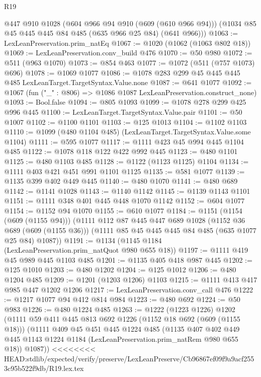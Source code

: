 \begin{lexlean}{R19}
\begin{coremodule}
{{{{{{{{{{{{{{{      @447
      @910
      @1028
      (@604 @966 @94 @910 (@609 (@610 @966 @94)))
      (@1034 @85 @45 @445 @445 @84 @485 (@635 @966 @25 @84) (@641 @966)))
@1063 := LexLeanPreservation.prim_natEq
@1067 := @1020 (@1062 (@1063 @802 @18))
@1069 := LexLeanPreservation.conv_build @476
@1070 := @50 @980
@1072 := @511 (@963 @1070)
@1073 := @854 @463
@1077 := @1072 (@511 (@757 @1073) @696)
@1078 := @1069 @1077
@1086 := @1078 @283 @299 @45 @445 @445 @485 LexLeanTarget.TargetSyntax.Value.none
@1087 := @641 @1077
@1092 := @1067 (fun ("_" : @806) => @1086 @1087 LexLeanPreservation.construct_none)
@1093 := Bool.false
@1094 := @805 @1093
@1099 := @1078 @278 @299 @425 @996 @445
@1100 := LexLeanTarget.TargetSyntax.Value.pair
@1101 := @50 @1007
@1102 := @1100 @1101
@1103 := @125 @1013
@1104 := @1102 @1103
@1110 := @1099 (@480 @1104 @485) (LexLeanTarget.TargetSyntax.Value.some @1104)
@1111 := @595 @1077
@1117 := @1111 @423 @45 @994 @445 @1104 @485
@1122 := @1078 @118 @122 @422 @992 @445
@1123 := @480 @1101
@1125 := @480 @1103 @485
@1128 := @1122 (@1123 @1125) @1104
@1134 := @1111 @403 @421 @451 @991 @1101 @1125
@1135 := @581 @1077
@1139 := @1135 @399 @402 @449 @445
@1140 := @480 @1070
@1141 := @480 @689
@1142 := @1141 @1028
@1143 := @1140 @1142
@1145 := @1139 @1143 @1101
@1151 := @1111 @348 @401 @445 @448 @1070 @1142
@1152 := @604 @1077
@1154 := @1152 @94 @1070
@1155 := @610 @1077
@1184 := @1151
    (@1154 (@609 (@1155 @94)))
    (@1111
      @112
      @87
      @445
      @447
      @689
      @1028
      (@1152 @36 @689 (@609 (@1155 @36)))
      (@1111 @85 @45 @445 @445 @84 @485 (@635 @1077 @25 @84) @1087))
@1191 := @1134 (@1145 @1184 (LexLeanPreservation.prim_natQuot @980 @655 @18))
@1197 := @1111 @419 @45 @989 @445 @1103 @485
@1201 := @1135 @405 @418 @987 @445
@1202 := @125 @1010
@1203 := @480 @1202
@1204 := @125 @1012
@1206 := @480 @1204 @485
@1209 := @1201 (@1203 @1206) @1103
@1215 := @1111 @413 @417 @985 @447 @1202 @1206
@1217 := LexLeanPreservation.conv_call @476
@1222 := @1217 @1077 @94 @412 @814 @984
@1223 := @480 @692
@1224 := @50 @983
@1226 := @480 @1224 @485
@1263 := @1222
    (@1223 @1226)
    @1202
    (@1111
      @59
      @411
      @445
      @813
      @692
      @1226
      (@1152 @18 @692 (@609 (@1155 @18)))
      (@1111
        @409
        @45
        @451
        @445
        @1224
        @485
        (@1135
          @407
          @402
          @449
          @445
          @1143
          @1224
          @1184
          (LexLeanPreservation.prim_natRem @980 @655 @18))
        @1087))
<<<<<<<< HEAD:stdlib/expected/verify/preserve/LexLeanPreserve/Cb96867ef09f9a9acf2553c95b522f9db/R19.lex.tex
}}}}}}}}}}}}}}}
\end{coremodule}
\end{lexlean}
